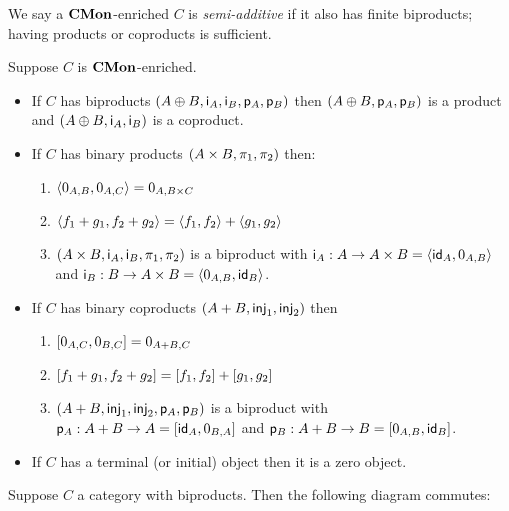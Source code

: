 We say a $\mathbf{CMon}$-enriched $C$ is \emph{semi-additive} if it also has finite biproducts; having products or
coproducts is sufficient.

\begin{proposition}
\label{prop:biproduct:from-product-or-coproduct}
Suppose $C$ is $\mathbf{CMon}$-enriched.
\begin{itemize}
\item If $C$ has biproducts $(A \oplus B, \mathsf{i}_A, \mathsf{i}_B, \mathsf{p}_A, \mathsf{p}_B)$ then $(A
\oplus B, \mathsf{p}_A, \mathsf{p}_B)$ is a product and $(A \oplus B, \mathsf{i}_A, \mathsf{i}_B)$ is a coproduct.
\item If $C$ has binary products $(A \times B, \pi_1, \pi_2)$ then:
\begin{enumerate}
\item $\langle 0_{A,B}, 0_{A,C}\rangle = 0_{A,B \times C}$
\item $\langle f_1 + g_1, f_2 + g_2\rangle = \langle f_1, f_2\rangle + \langle g_1, g_2\rangle$
\item $(A \times B, \mathsf{i}_A, \mathsf{i}_B, \pi_1, \pi_2)$ is a
biproduct with $\mathsf{i}_A: A \to A \times B = \langle \mathsf{id}_A, 0_{A,B}\rangle$ and $\mathsf{i}_B: B \to A \times B =
\langle 0_{A,B}, \mathsf{id}_B\rangle$.
\end{enumerate}
\item If $C$ has binary coproducts $(A + B, \mathsf{inj}_1, \mathsf{inj}_2)$ then
\begin{enumerate}
\item $[0_{A,C}, 0_{B,C}] = 0_{A + B,C}$
\item $[f_1 + g_1, f_2 + g_2] = [f_1, f_2] + [g_1, g_2]$
\item $(A + B, \mathsf{inj}_1, \mathsf{inj}_2, \mathsf{p}_A, \mathsf{p}_B)$ is a
biproduct with $\mathsf{p}_A: A + B \to A = [\mathsf{id}_A, 0_{B,A}]$ and $\mathsf{p}_B: A + B \to B =
[0_{A,B}, \mathsf{id}_B]$.
\end{enumerate}
\item If $C$ has a terminal (or initial) object then it is a zero object.
\end{itemize}
\end{proposition}

\begin{proposition}
\label{prop:biproduct:prod-coprod}
Suppose $C$ a category with biproducts. Then the following diagram commutes:

\begin{center}
\end{center}
\end{proposition}
